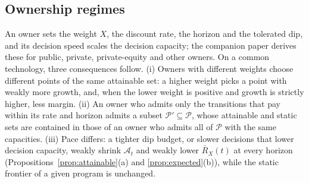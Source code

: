 \subsection{Ownership regimes}\label{supp:model-regimes}
\begin{remark}\label{rem:regimes}
An owner sets the weight $X$, the discount rate, the horizon and the tolerated dip, and its decision speed scales the decision capacity; the companion paper \citep{murthy2026transformation} derives these for public, private, private-equity and other owners. On a common technology, three consequences follow. (i) Owners with different weights choose different points of the same attainable set: a higher weight picks a point with weakly more growth, and, when the lower weight is positive and growth is strictly higher, less margin. (ii) An owner who admits only the transitions that pay within its rate and horizon admits a subset $\mathcal P'\subseteq\mathcal P$, whose attainable and static sets are contained in those of an owner who admits all of $\mathcal P$ with the same capacities. (iii) Pace differs: a tighter dip budget, or slower decisions that lower decision capacity, weakly shrink $\mathcal A_t$ and weakly lower $\bar R_X(t)$ at every horizon (Propositions~\ref{prop:attainable}(a) and \ref{prop:expected}(b)), while the static frontier of a given program is unchanged.
\end{remark}
